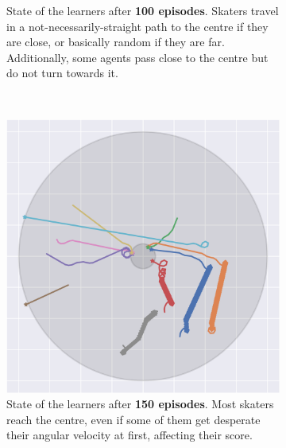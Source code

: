 \begin{figure}[H]
\begin{subfigure}[t]{.48\textwidth}
		\caption{State of the learners after \textbf{100 episodes}. Skaters travel in a not-necessarily-straight path to the centre if they are close, or basically random if they are far. Additionally, some agents pass close to the centre but do not turn towards it.}
	\end{subfigure} \\
	\begin{subfigure}[t]{.48\textwidth}
		\includegraphics[width=\textwidth]{circle_images/image_150.png}
		\caption{State of the learners after \textbf{150 episodes}. Most skaters reach the centre, even if some of them get desperate their angular velocity at first, affecting their score.}
	\end{subfigure}\hfill{}
	\begin{subfigure}[t]{.48\textwidth}

\end{subfigure}
\end{figure}
